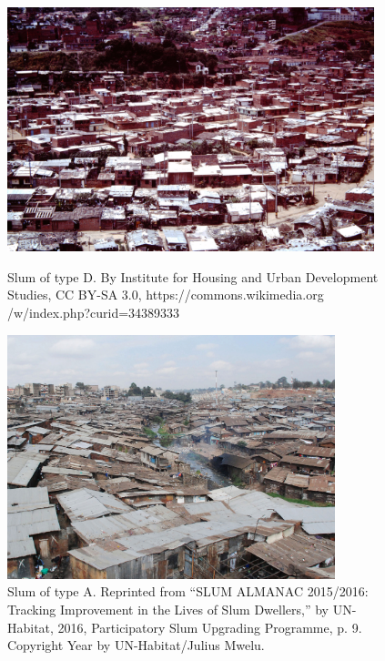 \documentclass[10pt]{article}
\begin{document}
\begin{figure}[h]
    \centering
    \begin{minipage}{0.45\linewidth}
        \centering
        \includegraphics[width=0.95\textwidth]{images/slum_medel.jpeg} 
        \caption{Slum of type D. By Institute for Housing and Urban Development Studies, CC BY-SA 3.0, https://commons.wikimedia.org /w/index.php?curid=34389333}
        \label{fig:slumD}
    \end{minipage}
    \hfill
    \begin{minipage}{0.50\linewidth}
        \centering
        \includegraphics[width=0.85\textwidth]{images/slum1.png}
        \caption{Slum of type A. Reprinted from “SLUM ALMANAC 2015/2016: Tracking Improvement in the Lives of Slum Dwellers,” by  UN-Habitat, 2016, Participatory Slum Upgrading Programme, p. 9. Copyright Year by UN-Habitat/Julius Mwelu.}
        \label{fig:slumA}
    \end{minipage}
\end{figure}
\end{document}

